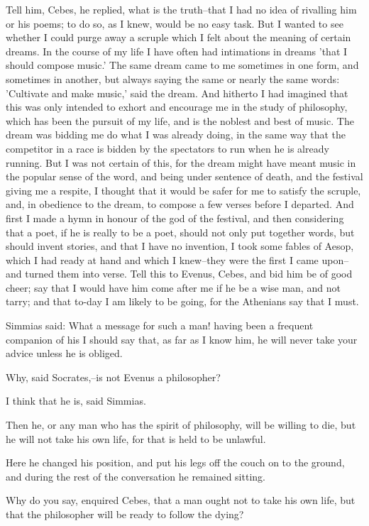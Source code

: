 Tell him, Cebes, he replied, what is the truth--that I had no idea of
rivalling him or his poems; to do so, as I knew, would be no easy task.
But I wanted to see whether I could purge away a scruple which I felt
about the meaning of certain dreams. In the course of my life I have
often had intimations in dreams 'that I should compose music.' The same
dream came to me sometimes in one form, and sometimes in another, but
always saying the same or nearly the same words: 'Cultivate and make
music,' said the dream. And hitherto I had imagined that this was only
intended to exhort and encourage me in the study of philosophy, which
has been the pursuit of my life, and is the noblest and best of music.
The dream was bidding me do what I was already doing, in the same way
that the competitor in a race is bidden by the spectators to run when he
is already running. But I was not certain of this, for the dream might
have meant music in the popular sense of the word, and being under
sentence of death, and the festival giving me a respite, I thought that
it would be safer for me to satisfy the scruple, and, in obedience to
the dream, to compose a few verses before I departed. And first I made
a hymn in honour of the god of the festival, and then considering that a
poet, if he is really to be a poet, should not only put together words,
but should invent stories, and that I have no invention, I took some
fables of Aesop, which I had ready at hand and which I knew--they were
the first I came upon--and turned them into verse. Tell this to Evenus,
Cebes, and bid him be of good cheer; say that I would have him come
after me if he be a wise man, and not tarry; and that to-day I am likely
to be going, for the Athenians say that I must.

Simmias said: What a message for such a man! having been a frequent
companion of his I should say that, as far as I know him, he will never
take your advice unless he is obliged.

Why, said Socrates,--is not Evenus a philosopher?

I think that he is, said Simmias.

Then he, or any man who has the spirit of philosophy, will be willing to
die, but he will not take his own life, for that is held to be unlawful.

Here he changed his position, and put his legs off the couch on to the
ground, and during the rest of the conversation he remained sitting.

Why do you say, enquired Cebes, that a man ought not to take his own
life, but that the philosopher will be ready to follow the dying?


